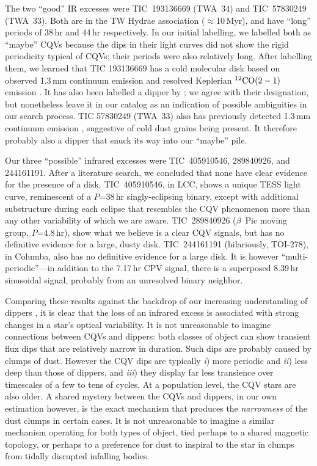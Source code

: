 \documentclass[11pt,twocolumn,tighten]{aastex63}
\begin{document}
The two ``good'' IR excesses were TIC~193136669 (TWA~34) and
TIC~57830249 (TWA~33).  Both are in the TW Hydrae association
($\approx$10\,Myr), and have ``long'' periods of 38\,hr and 44\,hr
respectively.  In our initial labelling, we labelled both as ``maybe''
CQVs because the dips in their light curves did not show the rigid
periodicity typical of CQVs;  their periods were also relatively
long.  After labelling them, we learned that TIC 193136669 has a cold
molecular disk based on observed 1.3\,mm continuum emission and
resolved Keplerian $^{12}{\rm CO}(2-1)$ emission
\citep{2015A&A...582L...5R}.  It has also been labelled a dipper by
\citet{2022ApJS..263...14C}; we agree with their designation, but
nonetheless leave it in our catalog as an indication of possible
ambiguities in our search process.  TIC 57830249 (TWA~33) also has
previously detected 1.3\,mm continuum emission
\citep{2015A&A...582L...5R}, suggestive of cold dust grains being
present.  It therefore probably also a dipper that snuck its way into
our ``maybe'' pile.

Our three ``possible'' infrared excesses were TIC~405910546,
289840926, and 244161191.  After a literature search, we concluded
that none have clear evidence for the presence of a disk.
TIC~405910546, in LCC, shows a unique TESS light curve, reminescent of
a $P$=38\,hr singly-eclipsing binary, except with additional
substructure during each eclipse that resembles the CQV phenomenon
more than any other variability of which we are aware.  TIC~289840926
($\beta$~Pic moving group, $P$=4.8\,hr), show what we believe is a
clear CQV signals, but has no definitive evidence for a large, dusty
disk.  TIC~244161191 (hilariously, TOI-278), in Columba, also has no
definitive evidence for a large disk.  It is however
``multi-periodic''---in addition to the 7.17\,hr CPV signal, there is
a superposed 8.39\,hr sinusoidal signal, probably from an unresolved
binary neighbor.

Comparing these results against the backdrop of our increasing
understanding of dippers
\citep[e.g.][]{2014AJ....147...82C,2016ApJ...816...69A,2021ApJ...908...16R,2022ApJS..263...14C},
it is clear that the loss of an infrared excess is associated with
strong changes in a star's optical variability.  It is not
unreasonable to imagine connections between CQVs and dippers: both
classes of object can show transient flux dips that are relatively
narrow in duration.  Such dips are probably caused by clumps of dust.
However the CQV dips are typically {\it i}) more periodic and {\it
ii}) less deep than those of dippers, and {\it iii}) they display far
less transience over timescales of a few to tens of cycles.  At a
population level, the CQV stars are also older.  A shared mystery
between the CQVs and dippers, in our own estimation however, is the
exact mechanism that produces the {\it narrowness} of the dust clumps
in certain cases.  It is not unreasonable to imagine a similar
mechanism operating for both types of object, tied perhaps to a shared
magnetic topology, or perhaps to a preference for dust to inspiral to
the star in clumps from tidally disrupted infalling bodies.
\end{document}
